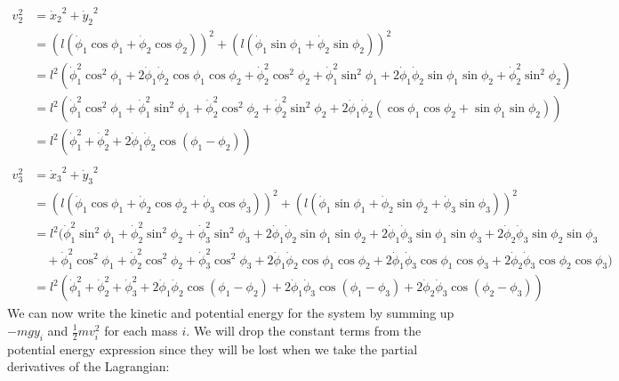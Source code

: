 \documentclass{article}
\begin{document}
\begin{appendices}
\begin{align}
        v_2^2 &= {\dot x_2}^2+{\dot y_2}^2 \\
        &= (l(\dot\phi_1\cos\phi_1+\dot\phi_2\cos\phi_2))^2
          +(l(\dot\phi_1\sin\phi_1+\dot\phi_2\sin\phi_2))^2 \\
        &= l^2\left( \dot\phi_1^2\cos^2\phi_1 
            + 2\dot\phi_1\dot\phi_2\cos\phi_1\cos\phi_2 
            + \dot\phi_2^2\cos^2\phi_2 + \dot\phi_1^2\sin^2\phi_1 
            + 2\dot\phi_1\dot\phi_2\sin\phi_1\sin\phi_2 
            + \dot\phi_2^2\sin^2\phi_2 \right) \\
        &= l^2\left( \dot\phi_1^2\cos^2\phi_1 + \dot\phi_1^2\sin^2\phi_1
            + \dot\phi_2^2\cos^2\phi_2 + \dot\phi_2^2\sin^2\phi_2
            + 2\dot\phi_1\dot\phi_2(\cos\phi_1\cos\phi_2 + \sin\phi_1\sin\phi_2)
             \right) \\
        &= l^2\left( \dot\phi_1^2 + \dot\phi_2^2
            + 2\dot\phi_1\dot\phi_2\cos(\phi_1 - \phi_2) \right) \\\\
        v_3^2 &= {\dot x_3}^2+{\dot y_3}^2 \\
        &= (l(\dot\phi_1\cos\phi_1+\dot\phi_2\cos\phi_2+\dot\phi_3\cos\phi_3))^2 
          +(l(\dot\phi_1\sin\phi_1+\dot\phi_2\sin\phi_2+\dot\phi_3\sin\phi_3))^2 \\
        &= l^2\bigl( \dot\phi_1^2\sin^2\phi_1+\dot\phi_2^2\sin^2\phi_2
           +\dot\phi_3^2\sin^2\phi_3 + 2\dot\phi_1\dot\phi_2\sin\phi_1\sin\phi_2
           +2\dot\phi_1\dot\phi_3\sin\phi_1\sin\phi_3
           +2\dot\phi_2\dot\phi_3\sin\phi_2\sin\phi_3 \\
           &\quad +\dot\phi_1^2\cos^2\phi_1+\dot\phi_2^2\cos^2\phi_2
           +\dot\phi_3^2\cos^2\phi_3 + 2\dot\phi_1\dot\phi_2\cos\phi_1\cos\phi_2
           +2\dot\phi_1\dot\phi_3\cos\phi_1\cos\phi_3
           +2\dot\phi_2\dot\phi_3\cos\phi_2\cos\phi_3
        \bigr) \\
        &= l^2\left( \dot\phi_1^2+\dot\phi_2^2 +\dot\phi_3^2 
           +2\dot\phi_1\dot\phi_2\cos(\phi_1-\phi_2)
           +2\dot\phi_1\dot\phi_3\cos(\phi_1-\phi_3)
           +2\dot\phi_2\dot\phi_3\cos(\phi_2-\phi_3) \right) 
    \end{align}
    We can now write the kinetic and potential energy for the system by summing
    up $-mgy_i$ and $\frac{1}{2}mv_i^2$ for each mass $i$. We will drop the
    constant terms from the potential energy expression since they will be lost
    when we take the partial derivatives of the Lagrangian:
    \begin{align}

\end{align}
\end{appendices}
\end{document}
